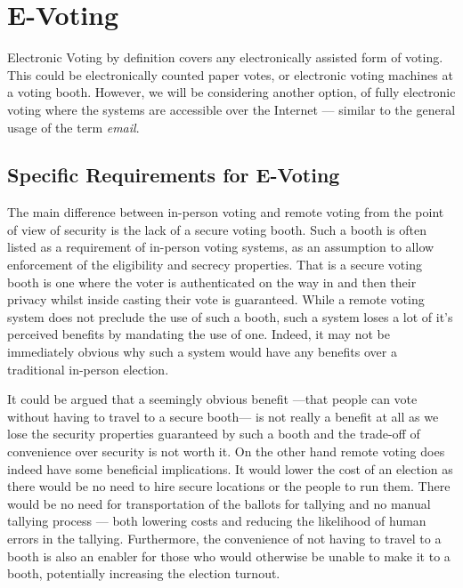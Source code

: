 
\chapter{E-Voting}
\label{ch:ev}

Electronic Voting by definition covers any electronically assisted form of voting. This could be electronically counted paper votes, or electronic voting machines at a voting booth. However, we will be considering another option, of fully electronic voting where the systems are accessible over the Internet --- similar to the general usage of the term \emph{email}.

\section{Specific Requirements for E-Voting}
\label{ch:ev:specific}

The main difference between in-person voting and remote voting from the point of view of security is the lack of a secure voting booth. Such a booth is often listed as a requirement of in-person voting systems, as an assumption to allow enforcement of the eligibility and secrecy properties. That is a secure voting booth is one where the voter is authenticated on the way in and then their privacy whilst inside casting their vote is guaranteed. While a remote voting system does not preclude the use of such a booth, such a system loses a lot of it's perceived benefits by mandating the use of one. Indeed, it may not be immediately obvious why such a system would have any benefits over a traditional in-person election.

It could be argued that a seemingly obvious benefit ---that people can vote without having to travel to a secure booth--- is not really a benefit at all as we lose the security properties guaranteed by such a booth and the trade-off of convenience over security is not worth it. On the other hand remote voting does indeed have some beneficial implications. It would lower the cost of an election as there would be no need to hire secure locations or the people to run them. There would be no need for transportation of the ballots for tallying and no manual tallying process --- both lowering costs and reducing the likelihood of human errors in the tallying. Furthermore, the convenience of not having to travel to a booth is also an enabler for those who would otherwise be unable to make it to a booth, potentially increasing the election turnout.

